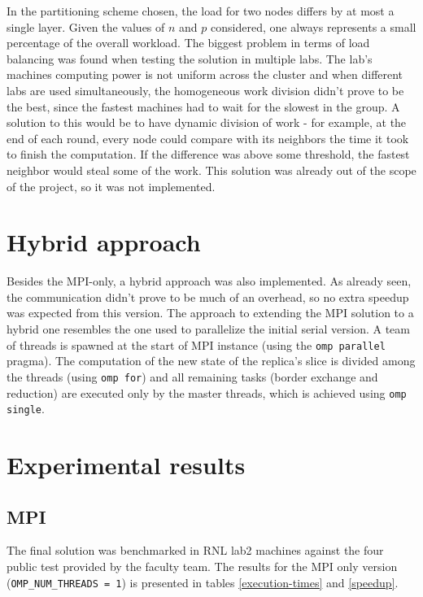 \documentclass{article}
\begin{document}
In the partitioning scheme chosen, the load for two nodes differs by at most
a single layer. Given the values of $n$ and $p$ considered, one always represents
a small percentage of the overall workload. The biggest problem in terms of load balancing
was found when testing the solution
in multiple labs. The lab's machines computing power is not uniform across
the cluster and when different labs are used simultaneously, the homogeneous work division
didn't prove to be the best, since the fastest machines had to wait for the slowest in the group.
A solution to
this would be to have dynamic division of work - for example, at the end
of each round, every node could compare with its neighbors the time it took to finish
the computation. If the difference was above some threshold, the fastest
neighbor would steal some of the work. This solution was already
out of the scope of the project, so it was not implemented.

\section{Hybrid approach}

Besides the MPI-only, a hybrid approach was also implemented.
As already seen, the communication didn't prove to be much of an overhead, so
no extra speedup was expected from this version. The approach to extending the MPI
solution to a hybrid one resembles the one used to parallelize the initial
serial version. A team of threads is spawned at the start of MPI instance (using
the \texttt{omp parallel} pragma). The computation of the new state of the replica's
slice is divided among the threads (using \texttt{omp for}) and all remaining tasks
(border exchange and reduction) are executed only by the master threads, which is
achieved using \texttt{omp single}.

\section{Experimental results}

\subsection{MPI}

The final solution was benchmarked in RNL lab2 machines against the four public
test provided by the faculty team. The results for the MPI only version 
(\texttt{OMP\_NUM\_THREADS = 1}) is presented in tables \ref{execution-times} and
\ref{speedup}.
\end{document}
